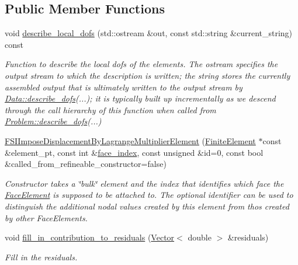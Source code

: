 \subsection*{Public Member Functions}
\begin{DoxyCompactItemize}
\item 
void \hyperlink{classoomph_1_1FSIImposeDisplacementByLagrangeMultiplierElement_ad53849f509cfd0d3eb469bfacf7cfabf}{describe\+\_\+local\+\_\+dofs} (std\+::ostream \&out, const std\+::string \&current\+\_\+string) const
\begin{DoxyCompactList}\small\item\em Function to describe the local dofs of the elements. The ostream specifies the output stream to which the description is written; the string stores the currently assembled output that is ultimately written to the output stream by \hyperlink{classoomph_1_1Data_a2dae16e2dcff9a40029f834c83364df5}{Data\+::describe\+\_\+dofs}(...); it is typically built up incrementally as we descend through the call hierarchy of this function when called from \hyperlink{classoomph_1_1Problem_abc103804eb319ae0b3d43870cc3e1eaf}{Problem\+::describe\+\_\+dofs}(...) \end{DoxyCompactList}\item 
\hyperlink{classoomph_1_1FSIImposeDisplacementByLagrangeMultiplierElement_a7044be589f6889ce01e69010a4030748}{F\+S\+I\+Impose\+Displacement\+By\+Lagrange\+Multiplier\+Element} (\hyperlink{classoomph_1_1FiniteElement}{Finite\+Element} $\ast$const \&element\+\_\+pt, const int \&\hyperlink{classoomph_1_1FaceElement_a478d577ac6db67ecc80f1f02ae3ab170}{face\+\_\+index}, const unsigned \&id=0, const bool \&called\+\_\+from\+\_\+refineable\+\_\+constructor=false)
\begin{DoxyCompactList}\small\item\em Constructor takes a \char`\"{}bulk\char`\"{} element and the index that identifies which face the \hyperlink{classoomph_1_1FaceElement}{Face\+Element} is supposed to be attached to. The optional identifier can be used to distinguish the additional nodal values created by this element from thos created by other Face\+Elements. \end{DoxyCompactList}\item 
void \hyperlink{classoomph_1_1FSIImposeDisplacementByLagrangeMultiplierElement_aadea4a492cc464dae2c77617a706a98d}{fill\+\_\+in\+\_\+contribution\+\_\+to\+\_\+residuals} (\hyperlink{classoomph_1_1Vector}{Vector}$<$ double $>$ \&residuals)
\begin{DoxyCompactList}\small\item\em Fill in the residuals. \end{DoxyCompactList}\item 

\end{DoxyCompactItemize}

